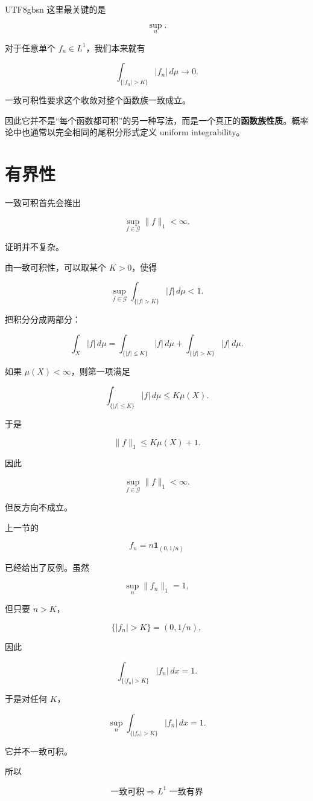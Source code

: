 \documentclass[11pt]{article}
\begin{document}
\begin{CJK*}{UTF8}{gbsn}
这里最关键的是

\[
\sup_n.
\]

对于任意单个 $f_n\in L^1$，我们本来就有

\[
\int_{\{|f_n|>K\}}|f_n|\,d\mu\to0.
\]

一致可积性要求这个收敛对整个函数族一致成立。

因此它并不是“每个函数都可积”的另一种写法，而是一个真正的\textbf{函数族性质}。概率论中也通常以完全相同的尾积分形式定义 uniform integrability。


\section{有界性}


一致可积首先会推出

\[
\sup_{f\in\mathcal G}
\|f\|_1<\infty.
\]

证明并不复杂。

由一致可积性，可以取某个 $K>0$，使得

\[
\sup_{f\in\mathcal G}
\int_{\{|f|>K\}}|f|\,d\mu
<1.
\]

把积分分成两部分：

\[
\int_X|f|\,d\mu
=
\int_{\{|f|\leq K\}}|f|\,d\mu
+
\int_{\{|f|>K\}}|f|\,d\mu.
\]

如果 $\mu(X)<\infty$，则第一项满足

\[
\int_{\{|f|\leq K\}}|f|\,d\mu
\leq
K\mu(X).
\]

于是

\[
\|f\|_1
\leq
K\mu(X)+1.
\]

因此

\[
\sup_{f\in\mathcal G}\|f\|_1<\infty.
\]

但反方向不成立。

上一节的

\[
f_n=n\mathbf1_{(0,1/n)}
\]

已经给出了反例。虽然

\[
\sup_n\|f_n\|_1=1,
\]

但只要 $n>K$，

\[
\{|f_n|>K\}
=
(0,1/n),
\]

因此

\[
\int_{\{|f_n|>K\}}|f_n|\,dx
=
1.
\]

于是对任何 $K$，

\[
\sup_n
\int_{\{|f_n|>K\}}|f_n|\,dx
=
1.
\]

它并不一致可积。

所以

\[
\boxed{
\text{一致可积}
\Longrightarrow
L^1\text{ 一致有界}
}
\]


\end{CJK*}
\end{document}
